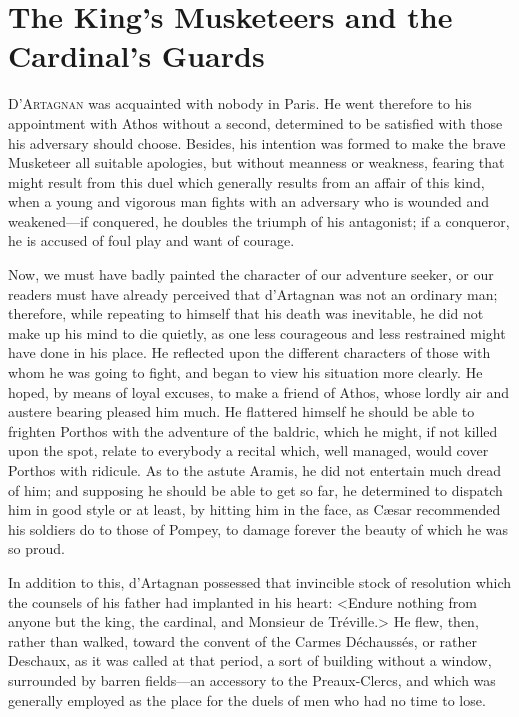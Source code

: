 
\chapter{The King's Musketeers and the Cardinal's Guards} 
	
\lettrine[]{D}{'Artagnan} was acquainted with nobody in Paris. He went therefore to his appointment with Athos without a second, determined to be satisfied with those his adversary should choose. Besides, his intention was formed to make the brave Musketeer all suitable apologies, but without meanness or weakness, fearing that might result from this duel which generally results from an affair of this kind, when a young and vigorous man fights with an adversary who is wounded and weakened---if conquered, he doubles the triumph of his antagonist; if a conqueror, he is accused of foul play and want of courage. 

Now, we must have badly painted the character of our adventure seeker, or our readers must have already perceived that d'Artagnan was not an ordinary man; therefore, while repeating to himself that his death was inevitable, he did not make up his mind to die quietly, as one less courageous and less restrained might have done in his place. He reflected upon the different characters of those with whom he was going to fight, and began to view his situation more clearly. He hoped, by means of loyal excuses, to make a friend of Athos, whose lordly air and austere bearing pleased him much. He flattered himself he should be able to frighten Porthos with the adventure of the baldric, which he might, if not killed upon the spot, relate to everybody a recital which, well managed, would cover Porthos with ridicule. As to the astute Aramis, he did not entertain much dread of him; and supposing he should be able to get so far, he determined to dispatch him in good style or at least, by hitting him in the face, as Cæsar recommended his soldiers do to those of Pompey, to damage forever the beauty of which he was so proud. 

In addition to this, d'Artagnan possessed that invincible stock of resolution which the counsels of his father had implanted in his heart: <Endure nothing from anyone but the king, the cardinal, and Monsieur de Tréville.> He flew, then, rather than walked, toward the convent of the Carmes Déchaussés, or rather Deschaux, as it was called at that period, a sort of building without a window, surrounded by barren fields---an accessory to the Preaux-Clercs, and which was generally employed as the place for the duels of men who had no time to lose. 

